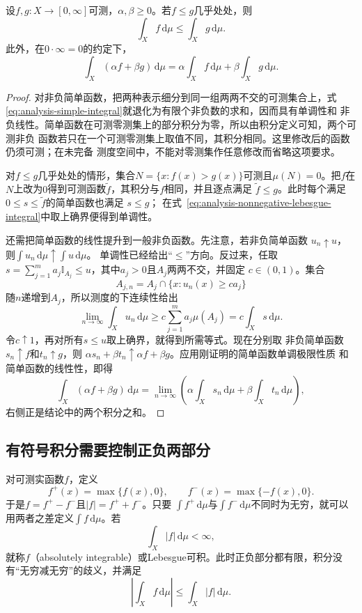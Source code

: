 \begin{lemma}[非负积分的线性与单调性]
\label{lem:analysis-nonnegative-integral-properties}
设$f,g:X\to[0,\infty]$可测，$\alpha,\beta\geq0$。若$f\leq g$几乎处处，则
\[
  \int_X f\,\mathrm{d}\mu\leq\int_X g\,\mathrm{d}\mu.
\]
此外，在$0\cdot\infty=0$的约定下，
\[
  \int_X(\alpha f+\beta g)\,\mathrm{d}\mu
  =
  \alpha\int_X f\,\mathrm{d}\mu
  +
  \beta\int_X g\,\mathrm{d}\mu.
\]
\end{lemma}
\begin{proof}
对非负简单函数，把两种表示细分到同一组两两不交的可测集合上，式
\eqref{eq:analysis-simple-integral}就退化为有限个非负数的求和，因而具有单调性和
非负线性。简单函数在可测零测集上的部分积分为零，所以由积分定义可知，两个可测非负
函数若只在一个可测零测集上取值不同，其积分相同。这里修改后的函数仍须可测；在未完备
测度空间中，不能对零测集作任意修改而省略这项要求。

对$f\leq g$几乎处处的情形，集合$N=\{x:f(x)>g(x)\}$可测且$\mu(N)=0$。把$f$在
$N$上改为$0$得到可测函数$\widetilde f$，其积分与$f$相同，并且逐点满足
$\widetilde f\leq g$。此时每个满足$0\leq s\leq\widetilde f$的简单函数也满足
$s\leq g$；
在式~\eqref{eq:analysis-nonnegative-lebesgue-integral}中取上确界便得到单调性。

还需把简单函数的线性提升到一般非负函数。先注意，若非负简单函数
$u_n\uparrow u$，则$\int u_n\,\mathrm{d}\mu\uparrow\int u\,\mathrm{d}\mu$。
单调性已经给出“$\leq$”方向。反过来，任取
$s=\sum_{j=1}^m a_j\mathbb{I}_{A_j}\leq u$，其中$a_j>0$且$A_j$两两不交，并固定
$c\in(0,1)$。集合
\[
  A_{j,n}=A_j\cap\{x:u_n(x)\geq ca_j\}
\]
随$n$递增到$A_j$，所以测度的下连续性给出
\[
  \lim_{n\to\infty}\int_Xu_n\,\mathrm{d}\mu
  \geq
  c\sum_{j=1}^m a_j\mu(A_j)
  =
  c\int_Xs\,\mathrm{d}\mu.
\]
令$c\uparrow1$，再对所有$s\leq u$取上确界，就得到所需等式。现在分别取
非负简单函数$s_n\uparrow f$和$t_n\uparrow g$，则
$\alpha s_n+\beta t_n\uparrow\alpha f+\beta g$。应用刚证明的简单函数单调极限性质
和简单函数的线性性，即得
\[
  \int_X(\alpha f+\beta g)\,\mathrm{d}\mu
  =
  \lim_{n\to\infty}
  \left(
    \alpha\int_Xs_n\,\mathrm{d}\mu
    +
    \beta\int_Xt_n\,\mathrm{d}\mu
  \right),
\]
右侧正是结论中的两个积分之和。
\end{proof}
\subsection{有符号积分需要控制正负两部分}

对可测实函数$f$，定义
\[   f^+(x)=\max\{f(x),0\},\qquad   f^-(x)=\max\{-f(x),0\}. \]
于是$f=f^+-f^-$且$|f|=f^++f^-$。只要 $\int f^+\,\mathrm{d}\mu$与$\int f^-\,\mathrm{d}\mu$不同时为无穷，就可以用两者之差定义$\int f\,\mathrm{d}\mu$。若
\begin{equation}
  \int_X|f|\,\mathrm{d}\mu<\infty,
\label{eq:analysis-absolute-integrability}
\end{equation}
就称$f$（absolutely integrable）或Lebesgue可积。此时正负部分都有限，积分没有“无穷减无穷”的歧义，并满足
\[   \left|\int_X f\,\mathrm{d}\mu\right|   \leq   \int_X|f|\,\mathrm{d}\mu. \]

